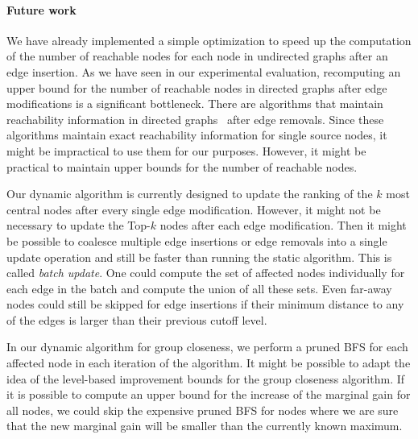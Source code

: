 \paragraph{Future work}
We have already implemented a simple optimization to speed up the computation of the number of reachable nodes for each node in undirected graphs after an edge insertion. As we have seen in our experimental evaluation, recomputing an upper bound for the number of reachable nodes in directed graphs after edge modifications is a significant bottleneck. There are algorithms that maintain reachability information in directed graphs~\cite{lkacki2013improved,chechik2016decremental} after edge removals. Since these algorithms maintain exact reachability information for single source nodes, it might be impractical to use them for our purposes. However, it might be practical to maintain upper bounds for the number of reachable nodes.

Our dynamic algorithm is currently designed to update the ranking of the $k$ most central nodes after every single edge modification. However, it might not be necessary to update the Top-$k$ nodes after each edge modification. Then it might be possible to coalesce multiple edge insertions or edge removals into a single update operation and still be faster than running the static algorithm. This is called \emph{batch update}. One could compute the set of affected nodes individually for each edge in the batch and compute the union of all these sets. Even far-away nodes could still be skipped for edge insertions if their minimum distance to any of the edges is larger than their previous cutoff level.

In our dynamic algorithm for group closeness, we perform a pruned BFS for each affected node in each iteration of the algorithm. It might be possible to adapt the idea of the level-based improvement bounds for the group closeness algorithm. If it is possible to compute an upper bound for the increase of the marginal gain for all nodes, we could skip the expensive pruned BFS for nodes where we are sure that the new marginal gain will be smaller than the currently known maximum.



